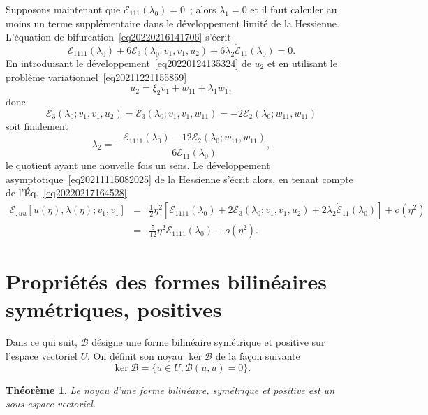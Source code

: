 \documentclass[12pt, final]{amsart}
\newtheorem{theorem}{Théorème}
\begin{document}
Supposons maintenant que $\mathcal{E}_{1  1  1} (\lambda_0) =
0$~; alors $\lambda_1 = 0$ et il faut calculer au moins un terme
supplémentaire dans le développement limité de la Hessienne.
L'équation de bifurcation~\eqref{eq20220216141706} s'écrit
\begin{equation}
  \label{eq20220217164528} \mathcal{E}_{1  1  1  1}
  (\lambda_0) + 6\mathcal{E}_3 (\lambda_0 ; v_1, v_1, u_2) + 6 \lambda_2
  \dot{\mathcal{E}}_{1  1} (\lambda_0) = 0.
\end{equation}
En introduisant le développement~\eqref{eq20220124135324} de $u_2$ et en
utilisant le probl{\`e}me variationnel~\eqref{eq20211221155859}
\begin{equation}
  u_2 = \xi_2 v_1 + w_{1  1} + \lambda_1 w_1,
\end{equation}
donc
\begin{equation}
  \mathcal{E}_3 (\lambda_0 ; v_1, v_1, u_2) =\mathcal{E}_3 (\lambda_0 ; v_1,
  v_1, w_{1  1}) = - 2\mathcal{E}_2 (\lambda_0 ; w_{11}, w_{11})
\end{equation}
soit finalement
\[ \lambda_2 = - \frac{\mathcal{E}_{1  1  1  1}
   (\lambda_0) - 12\mathcal{E}_2 (\lambda_0 ; w_{11}, w_{11})}{6
   \dot{\mathcal{E}}_{1  1} (\lambda_0)}, \]
le quotient ayant une nouvelle fois un sens. Le développement
asymptotique~\eqref{eq20211115082025} de la Hessienne s'écrit alors, en
tenant compte de l'Éq.~\eqref{eq20220217164528}
\begin{eqnarray}
  \mathcal{E}_{, u  u} [u (\eta), \lambda (\eta) ; v_1, v_1] & = &
  \tfrac{1}{2} \eta^2  [\mathcal{E}_{1  1  1  1}
  (\lambda_0) + 2\mathcal{E}_3 (\lambda_0 ; v_1, v_1, u_2) + 2 \lambda_2
  \dot{\mathcal{E}}_{1  1} (\lambda_0)] + o (\eta^2) \nonumber\\
  & = & \tfrac{5}{12} \eta^2 \mathcal{E}_{1  1  1  1}
  (\lambda_0) + o (\eta^2) .
\end{eqnarray}

\section{Propriétés des formes bilinéaires symétriques,
positives}

Dans ce qui suit, $\mathcal{B}$ désigne une forme bilinéaire
symétrique et positive sur l'espace vectoriel $U$. On définit son
noyau $\ker \mathcal{B}$ de la fa{\c c}on suivante
\begin{equation}
  \ker \mathcal{B}= \{u \in U, \mathcal{B}(u, u) = 0\} .
\end{equation}
\begin{theorem}
  Le noyau d'une forme bilinéaire, symétrique et positive est un
  sous-espace vectoriel.
\end{theorem}
\end{document}
